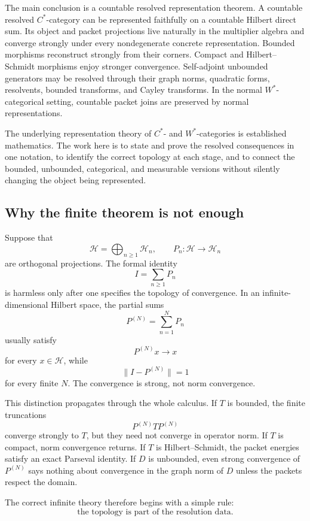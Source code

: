 \documentclass[11pt]{article}
\theoremstyle{definition}
\theoremstyle{remark}
\begin{document}
The main conclusion is a countable resolved representation theorem.  A countable resolved $C^*$-category can be represented faithfully on a countable Hilbert direct sum.  Its object and packet projections live naturally in the multiplier algebra and converge strongly under every nondegenerate concrete representation.  Bounded morphisms reconstruct strongly from their corners.  Compact and Hilbert--Schmidt morphisms enjoy stronger convergence.  Self-adjoint unbounded generators may be resolved through their graph norms, quadratic forms, resolvents, bounded transforms, and Cayley transforms.  In the normal $W^*$-categorical setting, countable packet joins are preserved by normal representations.

The underlying representation theory of $C^*$- and $W^*$-categories is established mathematics.  The work here is to state and prove the resolved consequences in one notation, to identify the correct topology at each stage, and to connect the bounded, unbounded, categorical, and measurable versions without silently changing the object being represented.

\subsection{Why the finite theorem is not enough}

Suppose that
\[
\mathcal H=\bigoplus_{n\ge1}\mathcal H_n,
\qquad
P_n:\mathcal H\to\mathcal H_n
\]
are orthogonal projections.  The formal identity
\[
I=\sum_{n\ge1}P_n
\]
is harmless only after one specifies the topology of convergence.  In an infinite-dimensional Hilbert space, the partial sums
\[
P^{(N)}=\sum_{n=1}^NP_n
\]
usually satisfy
\[
P^{(N)}x\longrightarrow x
\]
for every $x\in\mathcal H$, while
\[
\|I-P^{(N)}\|=1
\]
for every finite $N$.  The convergence is strong, not norm convergence.

This distinction propagates through the whole calculus.  If $T$ is bounded, the finite truncations
\[
P^{(N)}TP^{(N)}
\]
converge strongly to $T$, but they need not converge in operator norm.  If $T$ is compact, norm convergence returns.  If $T$ is Hilbert--Schmidt, the packet energies satisfy an exact Parseval identity.  If $D$ is unbounded, even strong convergence of $P^{(N)}$ says nothing about convergence in the graph norm of $D$ unless the packets respect the domain.

The correct infinite theory therefore begins with a simple rule:
\[
\boxed{\text{the topology is part of the resolution data.}}
\]
\end{document}
